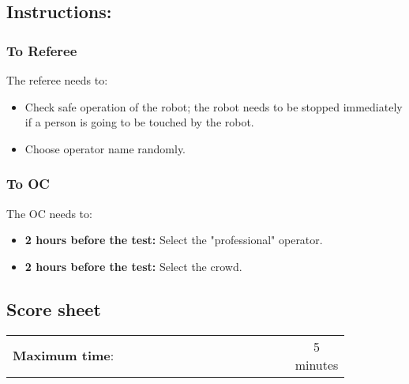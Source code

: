 \subsection*{Instructions:}
\subsubsection*{To Referee}

The referee needs to:
\begin{itemize}
	\item Check safe operation of the robot; the robot needs to be stopped immediately if a person is going to be touched by the robot.
	\item Choose operator name randomly.
\end{itemize}

\subsubsection*{To OC}
The OC needs to:
\begin{itemize}
    \item \textbf{2 hours before the test:} Select the "professional" operator.
    \item \textbf{2 hours before the test:} Select the crowd.
\end{itemize}

\newpage
\subsection*{Score sheet}

\begin{table}[h]
	\begin{tabular}{m{0.85\linewidth} c}
		\textbf{Maximum time}: & 5 minutes \\
	\end{tabular}
\end{table}

\begin{scorelist}

	




\end{scorelist}

\clearpage
